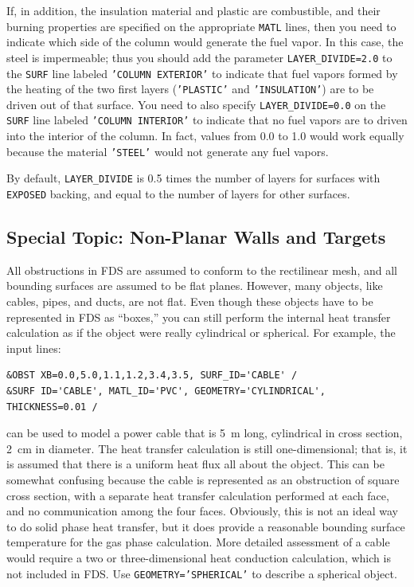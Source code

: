 \documentclass[11pt]{book}
\newcommand{\ct}{\tt\small}
\begin{document}
\noindent
If, in addition, the insulation material and plastic are combustible, and their burning properties are specified on the appropriate {\ct MATL} lines,
then you need to indicate which side of the column would generate the fuel vapor. In this case, the steel is impermeable; thus you should add the parameter
{\ct LAYER\_DIVIDE=2.0} to the {\ct SURF} line labeled {\ct 'COLUMN EXTERIOR'} to indicate that fuel vapors formed by the heating of the
two first layers ({\ct 'PLASTIC'} and {\ct 'INSULATION'}) are to be driven out of that surface.
You need to also specify {\ct LAYER\_DIVIDE=0.0} on the {\ct SURF} line labeled {\ct 'COLUMN INTERIOR'} to indicate that no fuel
vapors are to driven into the interior of the column. In fact, values from 0.0 to 1.0 would work equally because the material
{\ct 'STEEL'} would not generate any fuel vapors.

By default, {\ct LAYER\_DIVIDE} is 0.5 times the number of layers for surfaces with {\ct EXPOSED} backing, and equal to the number of
layers for other surfaces.







\subsection{Special Topic: Non-Planar Walls and Targets}

\label{info:GEOMETRY}

All obstructions in FDS are assumed to conform to the rectilinear
mesh, and all bounding surfaces are assumed to be flat
planes. However, many objects, like cables, pipes, and ducts, are not
flat. Even though these objects have to be represented in FDS as
``boxes,'' you can still perform the internal heat transfer
calculation as if the object were really cylindrical or spherical. For
example, the input lines:

\footnotesize
\begin{verbatim}
&OBST XB=0.0,5.0,1.1,1.2,3.4,3.5, SURF_ID='CABLE' /
&SURF ID='CABLE', MATL_ID='PVC', GEOMETRY='CYLINDRICAL', THICKNESS=0.01 /
\end{verbatim} \normalsize

\noindent
can be used to model a power cable that is 5~m long, cylindrical in
cross section, 2~cm in diameter. The heat transfer calculation is
still one-dimensional; that is, it is assumed that there is a uniform
heat flux all about the object. This can be somewhat confusing because
the cable is represented as an obstruction of square cross section,
with a separate heat transfer calculation performed at each face, and
no communication among the four faces. Obviously, this is not an ideal
way to do solid phase heat transfer, but it does provide a reasonable
bounding surface temperature for the gas phase calculation. More
detailed assessment of a cable would require a two or
three-dimensional heat conduction calculation, which is not included
in FDS. Use {\ct GEOMETRY='SPHERICAL'} to describe a spherical object.
\end{document}

